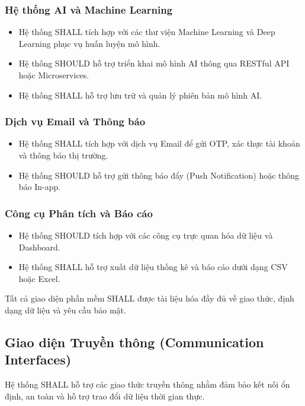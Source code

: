 \documentclass[12pt, a4paper]{article}
\begin{document}
\subsubsection{Hệ thống AI và Machine Learning}
\begin{itemize}
    \item Hệ thống SHALL tích hợp với các thư viện Machine Learning và Deep Learning phục vụ huấn luyện mô hình.

    \item Hệ thống SHOULD hỗ trợ triển khai mô hình AI thông qua RESTful API hoặc Microservices.

    \item Hệ thống SHALL hỗ trợ lưu trữ và quản lý phiên bản mô hình AI.
\end{itemize}


\subsubsection{Dịch vụ Email và Thông báo}
\begin{itemize}
    \item Hệ thống SHALL tích hợp với dịch vụ Email để gửi OTP, xác thực tài khoản và thông báo thị trường.

    \item Hệ thống SHOULD hỗ trợ gửi thông báo đẩy (Push Notification) hoặc thông báo In-app.
\end{itemize}


\subsubsection{Công cụ Phân tích và Báo cáo}
\begin{itemize}
    \item Hệ thống SHOULD tích hợp với các công cụ trực quan hóa dữ liệu và Dashboard.

    \item Hệ thống SHALL hỗ trợ xuất dữ liệu thống kê và báo cáo dưới dạng CSV hoặc Excel.
\end{itemize}

Tất cả giao diện phần mềm SHALL được tài liệu hóa đầy đủ về giao thức, định dạng dữ liệu và yêu cầu bảo mật.


\subsection{Giao diện Truyền thông (Communication Interfaces)}

Hệ thống SHALL hỗ trợ các giao thức truyền thông nhằm đảm bảo kết nối ổn định, an toàn và hỗ trợ trao đổi dữ liệu thời gian thực.
\end{document}
